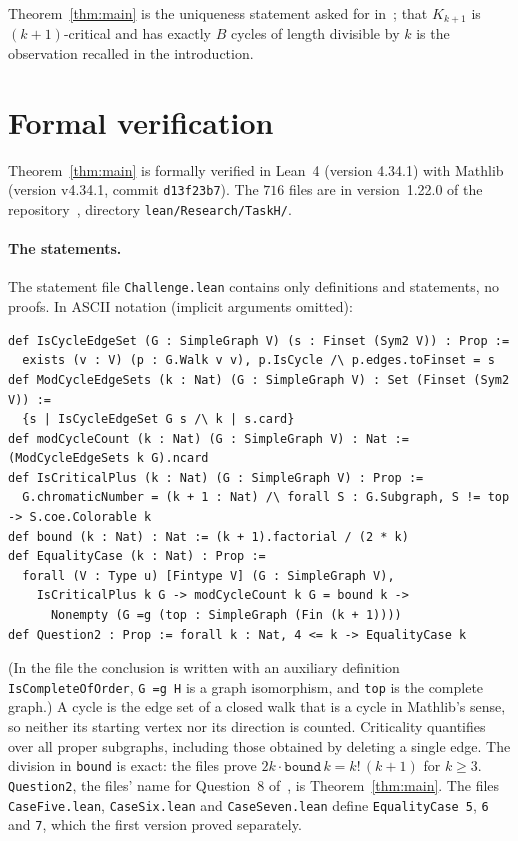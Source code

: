 \documentclass[11pt]{article}
\theoremstyle{remark}
\newcommand{\repoversion}{1.22.0}
\begin{document}
\medskip
Theorem~\ref{thm:main} is the uniqueness statement asked for in~\cite{cs}; that
$K_{k+1}$ is $(k+1)$-critical and has exactly $B$ cycles of length divisible by
$k$ is the observation recalled in the introduction.

\section{Formal verification}\label{sec:lean}

Theorem~\ref{thm:main} is formally verified in Lean~4 (version 4.34.1) with
Mathlib~\cite{mathlib} (version v4.34.1, commit \texttt{d13f23b7}). The $716$
files are in version~\repoversion{} of the repository~\cite{repo}, directory
\texttt{lean/\allowbreak Research/\allowbreak TaskH/}.

\paragraph{The statements.}
The statement file \texttt{Challenge.lean} contains only definitions and
statements, no proofs. In ASCII notation (implicit arguments omitted):
{\footnotesize
\begin{verbatim}
def IsCycleEdgeSet (G : SimpleGraph V) (s : Finset (Sym2 V)) : Prop :=
  exists (v : V) (p : G.Walk v v), p.IsCycle /\ p.edges.toFinset = s
def ModCycleEdgeSets (k : Nat) (G : SimpleGraph V) : Set (Finset (Sym2 V)) :=
  {s | IsCycleEdgeSet G s /\ k | s.card}
def modCycleCount (k : Nat) (G : SimpleGraph V) : Nat := (ModCycleEdgeSets k G).ncard
def IsCriticalPlus (k : Nat) (G : SimpleGraph V) : Prop :=
  G.chromaticNumber = (k + 1 : Nat) /\ forall S : G.Subgraph, S != top -> S.coe.Colorable k
def bound (k : Nat) : Nat := (k + 1).factorial / (2 * k)
def EqualityCase (k : Nat) : Prop :=
  forall (V : Type u) [Fintype V] (G : SimpleGraph V),
    IsCriticalPlus k G -> modCycleCount k G = bound k ->
      Nonempty (G =g (top : SimpleGraph (Fin (k + 1))))
def Question2 : Prop := forall k : Nat, 4 <= k -> EqualityCase k
\end{verbatim}}
\noindent (In the file the conclusion is written with an auxiliary definition
\texttt{IsCompleteOfOrder}, \texttt{G =g H} is a graph isomorphism, and
\texttt{top} is the complete graph.) A cycle is the edge set of a closed walk
that is a cycle in Mathlib's sense, so neither its starting vertex nor its
direction is counted. Criticality quantifies over all proper subgraphs,
including those obtained by deleting a single edge. The division in
\texttt{bound} is exact: the files prove $2k\cdot\texttt{bound}\,k=k!\,(k+1)$
for $k\ge3$. \texttt{Question2}, the files' name for Question~8
of~\cite{cs}, is Theorem~\ref{thm:main}. The files
\texttt{CaseFive.lean}, \texttt{CaseSix.lean} and \texttt{CaseSeven.lean}
define \texttt{EqualityCase 5}, \texttt{6} and \texttt{7}, which the first
version proved separately.
\end{document}
